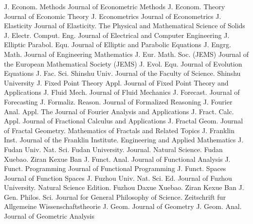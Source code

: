 {J. Econom. Methods}
{Journal of Econometric Methods}
{J. Econom. Theory}
{Journal of Economic Theory}
{J. Econometrics}
{Journal of Econometrics}
{J. Elasticity}
{Journal of Elasticity. The Physical and Mathematical Science of Solids}
{J. Electr. Comput. Eng.}
{Journal of Electrical and Computer Engineering}
{J. Elliptic Parabol. Equ.}
{Journal of Elliptic and Parabolic Equations}
{J. Engrg. Math.}
{Journal of Engineering Mathematics}
{J. Eur. Math. Soc. (JEMS)}
{Journal of the European Mathematical Society (JEMS)}
{J. Evol. Equ.}
{Journal of Evolution Equations}
{J. Fac. Sci. Shinshu Univ.}
{Journal of the Faculty of Science. Shinshu University}
{J. Fixed Point Theory Appl.}
{Journal of Fixed Point Theory and Applications}
{J. Fluid Mech.}
{Journal of Fluid Mechanics}
{J. Forecast.}
{Journal of Forecasting}
{J. Formaliz. Reason.}
{Journal of Formalized Reasoning}
{J. Fourier Anal. Appl.}
{The Journal of Fourier Analysis and Applications}
{J. Fract. Calc. Appl.}
{Journal of Fractional Calculus and Applications}
{J. Fractal Geom.}
{Journal of Fractal Geometry. Mathematics of Fractals and Related Topics}
{J. Franklin Inst.}
{Journal of the Franklin Institute. Engineering and Applied Mathematics}
{J. Fudan Univ. Nat. Sci.}
{Fudan University. Journal. Natural Science. Fudan Xuebao. Ziran Kexue Ban}
{J. Funct. Anal.}
{Journal of Functional Analysis}
{J. Funct. Programming}
{Journal of Functional Programming}
{J. Funct. Spaces}
{Journal of Function Spaces}
{J. Fuzhou Univ. Nat. Sci. Ed.}
{Journal of Fuzhou University. Natural Science Edition. Fuzhou Daxue Xuebao. Ziran Kexue Ban}
{J. Gen. Philos. Sci.}
{Journal for General Philosophy of Science. Zeitschrift fur Allgemeine Wissenschaftstheorie}
{J. Geom.}
{Journal of Geometry}
{J. Geom. Anal.}
{Journal of Geometric Analysis}
